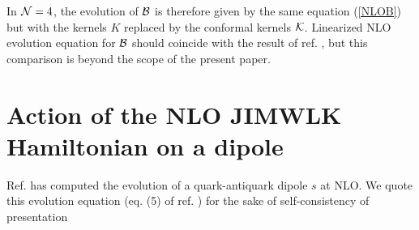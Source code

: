 \documentclass[11pt,a4paper]{article}
\begin{document}
In ${\cal N}=4$, the evolution of $\cal B$ is therefore given by the same equation (\ref{NLOB}) but with  the kernels $K$ replaced by the conformal kernels $\cal K$.
Linearized NLO evolution equation for ${\cal B}$ should coincide with the result of ref. \cite{NLOBKP}, but this comparison is beyond the scope of the present paper. 


\appendix

\section{Action of the NLO JIMWLK Hamiltonian on a dipole}

Ref. \cite{BC}  has computed the evolution of a quark-antiquark dipole $s$ at NLO.  We quote this evolution equation (eq. (5) of ref. \cite{BC}) for the sake of self-consistency of presentation
\end{document}
